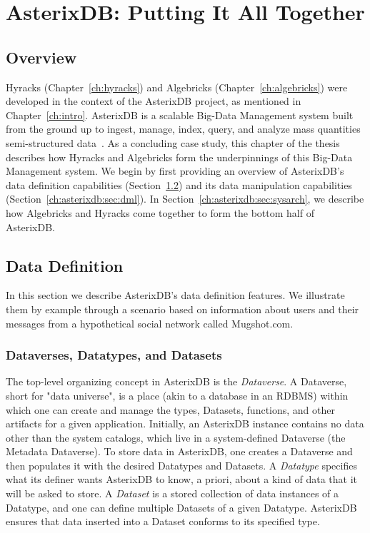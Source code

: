 \chapter{AsterixDB: Putting It All Together}
\label{ch:asterixdb}

\section{Overview}

Hyracks (Chapter~\ref{ch:hyracks}) and Algebricks (Chapter~\ref{ch:algebricks}) were developed in the context of the AsterixDB project, as mentioned in Chapter~\ref{ch:intro}. AsterixDB is a scalable Big-Data Management system built from the
ground up to ingest, manage, index, query, and analyze mass quantities semi-structured data~\cite{vision}. As a concluding case study, this chapter of the thesis describes
how Hyracks and Algebricks form the underpinnings of this Big-Data Management system. We begin by first providing an overview of AsterixDB's data definition capabilities (Section~\ref{ch:asterixdb:sec:ddl}) and its data manipulation capabilities (Section~\ref{ch:asterixdb:sec:dml}). In Section~\ref{ch:asterixdb:sec:sysarch}, we describe how Algebricks and Hyracks come together to form the bottom half of AsterixDB.

\section{Data Definition}
\label{ch:asterixdb:sec:ddl}

In this section we describe AsterixDB's data definition features.  We illustrate them by example through a scenario based on information about users and their messages from a hypothetical social network called Mugshot.com.

\subsection{Dataverses, Datatypes, and Datasets\label{ssec:dataverse}}

The top-level organizing concept in AsterixDB is the \emph{Dataverse}.
A Dataverse, short for "data universe", is a place (akin to a database in an RDBMS) within which one can create and manage the types, Datasets, functions, and other artifacts for a given application.
Initially, an AsterixDB instance contains no data other than the system catalogs, which live in a system-defined Dataverse (the Metadata Dataverse).
To store data in AsterixDB, one creates a Dataverse and then populates it with the desired Datatypes and Datasets.
A \emph{Datatype} specifies what its definer wants AsterixDB to know, a priori, about a kind of data that it will be asked to store.
A \emph{Dataset} is a stored collection of data instances of a Datatype, and one can define multiple Datasets of a given Datatype.
AsterixDB ensures that data inserted into a Dataset conforms to its specified type. 

